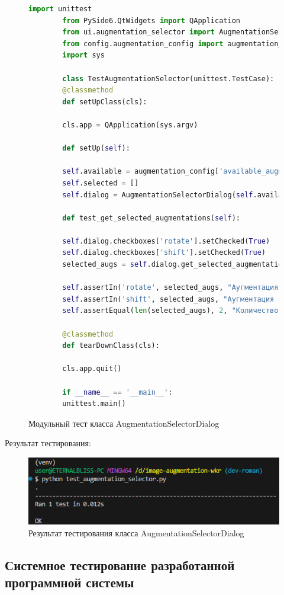 \begin{figure}[H]
	\begin{lstlisting}[language=Python]
		import unittest
		from PySide6.QtWidgets import QApplication
		from ui.augmentation_selector import AugmentationSelectorDialog
		from config.augmentation_config import augmentation_config
		import sys
		
		class TestAugmentationSelector(unittest.TestCase):
		@classmethod
		def setUpClass(cls):
		
		cls.app = QApplication(sys.argv)
		
		def setUp(self):
		
		self.available = augmentation_config['available_augmentations']
		self.selected = []
		self.dialog = AugmentationSelectorDialog(self.available, self.selected)
		
		def test_get_selected_augmentations(self):
		
		self.dialog.checkboxes['rotate'].setChecked(True)
		self.dialog.checkboxes['shift'].setChecked(True)
		selected_augs = self.dialog.get_selected_augmentations()
		
		self.assertIn('rotate', selected_augs, "Аугментация 'rotate' не выбрана.")
		self.assertIn('shift', selected_augs, "Аугментация 'shift' не выбрана.")
		self.assertEqual(len(selected_augs), 2, "Количество выбранных аугментаций не соответствует ожидаемому (2).")
		
		@classmethod
		def tearDownClass(cls):
		
		cls.app.quit()
		
		if __name__ == '__main__':
		unittest.main()
	\end{lstlisting}  
	\caption{Модульный тест класса AugmentationSelectorDialog}
	\label{model_test:test8}
\end{figure}

Результат тестирования:
\begin{figure}[H]
	\centering
	\includegraphics[width=0.7\linewidth]{images/resulttest8}
	\caption{Результат тестирования класса AugmentationSelectorDialog}
	\label{fig:resulttest8}
\end{figure}

\subsection{Системное тестирование разработанной программной системы}

